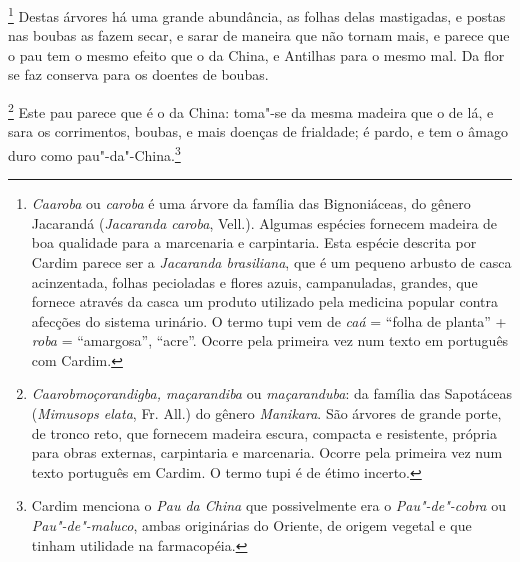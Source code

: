\footnote{ \textit{Caaroba} ou \textit{caroba} é
uma árvore da família das Bignoniáceas, do gênero Jacarandá
(\textit{Jacaranda caroba}, Vell.). Algumas espécies fornecem madeira
de boa qualidade para a marcenaria e carpintaria. Esta espécie descrita
por Cardim parece ser a \textit{Jacaranda brasiliana}, que é um pequeno
arbusto de casca acinzentada, folhas pecioladas e flores azuis,
campanuladas, grandes, que fornece através da casca um produto
utilizado pela medicina popular contra afecções do sistema urinário. O
termo tupi vem de \textit{caá} = ``folha de planta'' + \textit{roba} = ``amargosa'', 
``acre''. Ocorre pela primeira vez num texto em português com
Cardim.} Destas árvores há uma grande abundância, as folhas
delas mastigadas, e postas nas boubas as fazem secar, e sarar de
maneira que não tornam mais, e parece que o pau tem o mesmo efeito que
o da China, e Antilhas para o mesmo mal. Da flor se faz conserva para
os doentes de boubas.

\footnote{ \textit{Caarobmoçorandigba,
maçarandiba} ou \textit{maçaranduba}: da família das Sapotáceas
(\textit{Mimusops elata}, Fr. All.) do gênero \textit{Manikara}. São
árvores de grande porte, de tronco reto, que fornecem madeira escura,
compacta e resistente, própria para obras externas, carpintaria e
marcenaria. Ocorre pela primeira vez num texto português em Cardim. O
termo tupi é de étimo incerto.} Este pau parece
que é o da China: toma"-se da mesma madeira que o de lá, e sara os
corrimentos, boubas, e mais doenças de frialdade; é pardo, e tem o
âmago duro como pau"-da"-China.\footnote{ Cardim menciona o \textit{Pau
da China} que possivelmente era o \textit{Pau"-de"-cobra} ou
\textit{Pau"-de"-maluco}, ambas originárias do Oriente, de origem vegetal
e que tinham utilidade na farmacopéia.} 

